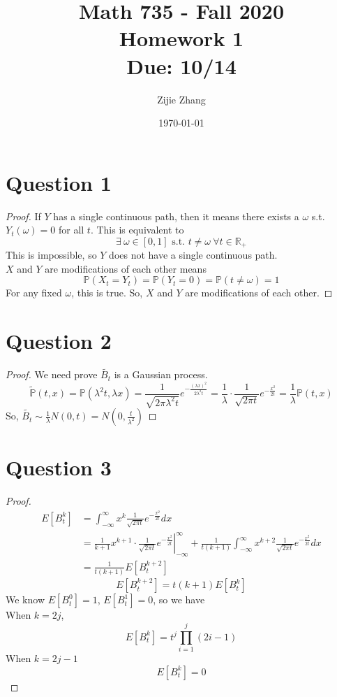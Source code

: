 \documentclass{article}
\title{Math 735 - Fall 2020\\
        {\Large \textbf{Homework 1}}\\
        {\normalsize \textbf{Due: 10/14}}
    }
\author{Zijie Zhang}
\date{\today}
\begin{document}
    \maketitle
\section*{Question 1}
    \begin{proof}
        If $Y$ has a single continuous path, then it means there exists a $\omega$ s.t. $Y_t(\omega)=0$ for all $t$. This is equivalent to
        $$\exists\  \omega \in [0,1] \text{ s.t. } t \not= \omega \ \forall t\in \mathbb{R}_{+}$$
        This is impossible, so $Y$ does not have a single continuous path.\\
        $X$ and $Y$ are modifications of each other means
        $$\mathbb{P}(X_t=Y_t)=\mathbb{P}(Y_t=0)=\mathbb{P}(t \not= \omega)=1$$
        For any fixed $\omega$, this is true. So, $X$ and $Y$ are modifications of each other.
    \end{proof}

\section*{Question 2}
    \begin{proof}
    We need prove $\widetilde{B_t}$ is a Gaussian process.
    $$\widetilde{\mathbb{P}}(t,x)=\mathbb{P}(\lambda^2 t, \lambda x)=\frac{1}{\sqrt{2\pi \lambda^2 t}}e^{-\frac{(\lambda x)^2}{2\lambda^2 t}}=\frac{1}{\lambda}\cdot\frac{1}{\sqrt{2\pi t}}e^{-\frac{x^2}{2t}}=\frac{1}{\lambda}\mathbb{P}(t,x)$$
    So, $\widetilde{B_t}\sim \frac{1}{\lambda}N(0,t)=N(0,\frac{t}{\lambda^2})$
    \end{proof}

\section*{Question 3}
    \begin{proof}
    \begin{align*}
        E[B_t^k] &=\int_{-\infty}^{\infty} x^k \frac{1}{\sqrt{2\pi t}}e^{-\frac{x^2}{2t}}dx\\
        &=\left.\frac{1}{k+1}x^{k+1}\cdot\frac{1}{\sqrt{2\pi t}}e^{-\frac{x^2}{2t}}\right|_{-\infty}^{\infty}+\frac{1}{t(k+1)}\int_{-\infty}^{\infty}x^{k+2}\frac{1}{\sqrt{2\pi t}}e^{-\frac{x^2}{2t}}dx\\
        &=\frac{1}{t(k+1)}E[B_t^{k+2}]
    \end{align*}
    $$E[B_t^{k+2}]=t(k+1)E[B_t^k]$$
    We know $E[B_t^0]=1$, $E[B_t^1]=0$, so we have\\
    When $k=2j$,
    $$E[B_t^k]=t^j\prod_{i=1}^j(2i-1)$$
    When $k=2j-1$
    $$E[B_t^k]=0$$
    \end{proof}
\end{document}
